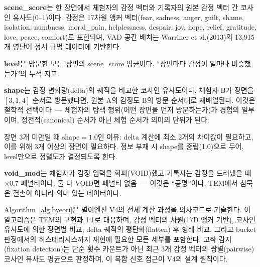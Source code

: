 \documentclass[11pt, a4paper]{article}
\begin{document}
\textbf{scene\_score}는 한 장면에서 체험자의 감정 벡터와 기록자의 원본 감정 벡터 간 코사인 유사도(0--1)이다. 감정은 17차원 앵커 벡터(fear, sadness, anger, guilt, shame, isolation, numbness, moral\_pain, helplessness, despair, joy, hope, relief, gratitude, love, peace, comfort)로 표현되며, VAD 공간 배치는 Warriner et al.(2013)의 13,915개 영단어 정서 규범 데이터에 기반한다\cite{warriner2013}.

\textbf{level}은 방문한 모든 장면의 scene\_score 평균이다. ``장면마다 감정이 얼마나 비슷했는가''의 누적 지표.

\textbf{shape}는 감정 변화량(delta)의 궤적을 비교한 코사인 유사도이다. 체험자 B가 장면을 $[3, 1, 4]$ 순서로 방문했다면, 원본 A의 감정도 B의 방문 순서대로 재배열된다. 이것은 철학적 선택이다~--- 체험자의 탐색 행위(어떤 장면을 먼저 방문하는가)가 경험의 일부이며, 정전적(canonical) 순서가 아닌 체험 순서가 의미의 단위가 된다.

장면 3개 미만일 때 $\text{shape} = 1.0$인 이유: delta 계산에 최소 2개의 차이값이 필요하고, 이를 위해 3개 이상의 장면이 필요하다. 정보 부재 시 shape를 중립(1.0)으로 두어, level만으로 정렬도가 결정되도록 한다.

\textbf{void\_mod}는 체험자가 감정 입력을 회피(VOID)했고 기록자는 감정을 드러냈을 때 $\times 0.7$ 페널티이다. 둘 다 VOID면 페널티 없음~--- 이것은 ``공명''이다. TEM에서 침묵은 결손이 아니라 의미 있는 데이터이다.

Algorithm~\ref{alg:byeori}은 별이엔진 V4의 전체 계산 과정을 의사코드로 기술한다. 이 알고리즘은 TEM의 구현과 1:1로 대응하며, 감정 벡터의 차원(17D 앵커 기반), 코사인 유사도에 의한 장면별 비교, delta 궤적의 평탄화(flatten) 후 형태 비교, 그리고 bucket 판정에서의 히스테리시스까지 재현에 필요한 모든 세부를 포함한다. 고착 감지(fixation detection)는 단순 횟수 카운트가 아닌 최근 3개 감정 벡터의 쌍별(pairwise) 코사인 유사도 평균으로 판정하며, 이 복합 신호 접근이 V4의 설계 원칙이다.
\end{document}
